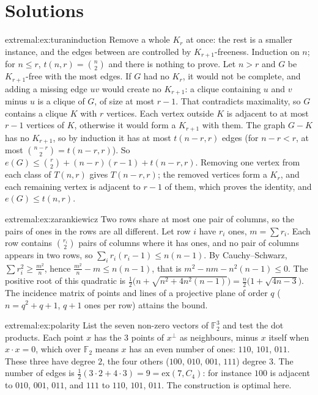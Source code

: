 \section{Solutions}

\begin{solution}{extremal:ex:turaninduction}
\idea Remove a whole $K_r$ at once: the rest is a smaller instance, and the edges between are controlled by $K_{r+1}$-freeness.
\writeup Induction on $n$; for $n\le r$, $t(n,r)=\binom n2$ and there is nothing to prove. Let $n>r$ and $G$ be $K_{r+1}$-free with the most edges. If $G$ had no $K_r$, it would not be
complete, and adding a missing edge $uv$ would create no $K_{r+1}$: a clique containing $u$ and $v$ minus $u$ is a clique of $G$, of size at most $r-1$. That contradicts maximality, so $G$
contains a clique $K$ with $r$ vertices. Each vertex outside $K$ is adjacent to at most
$r-1$ vertices of $K$, otherwise it would form a $K_{r+1}$ with them. The graph $G-K$ has no $K_{r+1}$, so by induction it has at most $t(n-r,r)$ edges (for $n-r<r$, at most
$\binom{n-r}2=t(n-r,r)$). So $e(G)\le\binom r2+(n-r)(r-1)+t(n-r,r)$. Removing one vertex from each class of $T(n,r)$ gives $T(n-r,r)$; the removed vertices form a $K_r$,
and each remaining vertex is adjacent to $r-1$ of them, which proves the identity, and $e(G)\le t(n,r)$.
\end{solution}

\begin{solution}{extremal:ex:zarankiewicz}
\idea Two rows share at most one pair of columns, so the pairs of ones in the rows are all different.
\writeup Let row $i$ have $r_i$ ones, $m=\sum r_i$. Each row contains $\binom{r_i}2$ pairs of columns where it has ones, and no pair of columns appears in two rows, so
$\sum_i r_i(r_i-1)\le n(n-1)$. By Cauchy--Schwarz, $\sum r_i^2\ge\frac{m^2}n$, hence $\frac{m^2}n-m\le n(n-1)$, that is $m^2-nm-n^2(n-1)\le0$. The positive root of this quadratic is
$\frac12\bigl(n+\sqrt{n^2+4n^2(n-1)}\bigr)=\frac n2\bigl(1+\sqrt{4n-3}\bigr)$. The incidence matrix of points and lines of a projective plane of order $q$ ($n=q^2+q+1$, $q+1$ ones per row) attains the bound.
\end{solution}

\begin{solution}{extremal:ex:polarity}
\idea List the seven non-zero vectors of $\mathbb F_2^3$ and test the dot products.
\writeup Each point $x$ has the $3$ points of $x^\perp$ as neighbours, minus $x$ itself when $x\cdot x=0$, which over $\mathbb F_2$ means $x$ has an even number of ones: $110$, $101$, $011$. These
three have degree $2$, the four others ($100$, $010$, $001$, $111$) degree $3$. The number of edges is $\frac12(3\cdot2+4\cdot3)=9=\mathrm{ex}(7,C_4)$: for instance $100$ is adjacent to $010$, $001$, $011$, and
$111$ to $110$, $101$, $011$. The construction is optimal here.
\end{solution}

